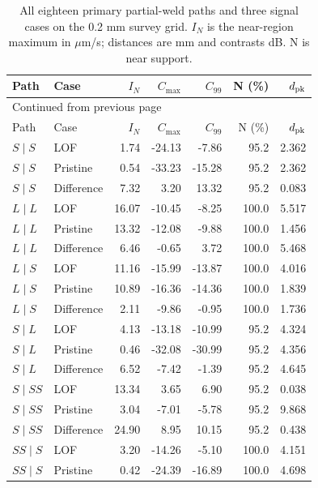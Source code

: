 \documentclass[11pt]{article}
\begin{document}
{\small\setlength{\tabcolsep}{4pt}
\begin{longtable}{@{}llrrrrr@{}}
\caption{All eighteen primary partial-weld paths and three signal cases on the 0.2 mm survey grid. $I_N$ is the near-region maximum in $\mu$m/s; distances are mm and contrasts dB. N is near support.}\label{saft:archive:partial:primary_register}\\
\toprule Path & Case & $I_N$ & $C_{\max}$ & $C_{99}$ & N (\%) & $d_{\rm pk}$\\\midrule\endfirsthead
\multicolumn{7}{l}{\small Continued from previous page}\\\toprule Path & Case & $I_N$ & $C_{\max}$ & $C_{99}$ & N (\%) & $d_{\rm pk}$\\\midrule\endhead
\bottomrule\endfoot
$S\mid S$ & LOF & 1.74 & -24.13 & -7.86 & 95.2 & 2.362 \\
$S\mid S$ & Pristine & 0.54 & -33.23 & -15.28 & 95.2 & 2.362 \\
$S\mid S$ & Difference & 7.32 & 3.20 & 13.32 & 95.2 & 0.083 \\
\addlinespace
$L\mid L$ & LOF & 16.07 & -10.45 & -8.25 & 100.0 & 5.517 \\
$L\mid L$ & Pristine & 13.32 & -12.08 & -9.88 & 100.0 & 1.456 \\
$L\mid L$ & Difference & 6.46 & -0.65 & 3.72 & 100.0 & 5.468 \\
\addlinespace
$L\mid S$ & LOF & 11.16 & -15.99 & -13.87 & 100.0 & 4.016 \\
$L\mid S$ & Pristine & 10.89 & -16.36 & -14.36 & 100.0 & 1.839 \\
$L\mid S$ & Difference & 2.11 & -9.86 & -0.95 & 100.0 & 1.736 \\
\addlinespace
$S\mid L$ & LOF & 4.13 & -13.18 & -10.99 & 95.2 & 4.324 \\
$S\mid L$ & Pristine & 0.46 & -32.08 & -30.99 & 95.2 & 4.356 \\
$S\mid L$ & Difference & 6.52 & -7.42 & -1.39 & 95.2 & 4.645 \\
\addlinespace
$S\mid SS$ & LOF & 13.34 & 3.65 & 6.90 & 95.2 & 0.038 \\
$S\mid SS$ & Pristine & 3.04 & -7.01 & -5.78 & 95.2 & 9.868 \\
$S\mid SS$ & Difference & 24.90 & 8.95 & 10.15 & 95.2 & 0.438 \\
\addlinespace
$SS\mid S$ & LOF & 3.20 & -14.26 & -5.10 & 100.0 & 4.151 \\
$SS\mid S$ & Pristine & 0.42 & -24.39 & -16.89 & 100.0 & 4.698 \\

\end{longtable}}
\end{document}
